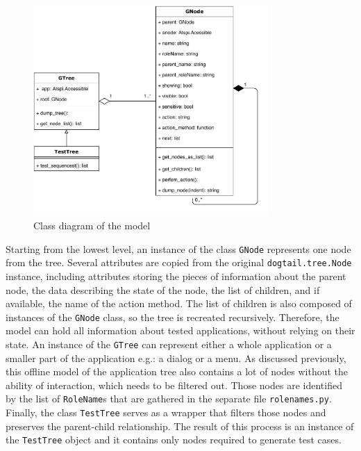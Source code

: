 \begin{figure}[hbt]
	\centering
	\includegraphics[width=0.8\textwidth,clip]{obrazky-figures/tree_diagram.pdf}
	\caption{Class diagram of the model}
	\label{tree_diagram}
\end{figure}

Starting from the lowest level, an instance of the class \texttt{GNode} represents one node from the tree. Several attributes are copied from the original \texttt{dogtail.tree.Node} instance, including attributes storing the pieces of information about the parent node, the data describing the state of the node, the list of children, and if available, the name of the action method. The list of children is also composed of instances of the \texttt{GNode} class, so the tree is recreated recursively. Therefore, the model can hold all information about tested applications, without relying on their state. An instance of the \texttt{GTree} can represent either a whole application or a smaller part of the application e.g.: a dialog or a menu. As discussed previously, this offline model of the application tree also contains a lot of nodes without the ability of interaction, which needs to be filtered out. Those nodes are identified by the list of \texttt{RoleName}s that are gathered in the separate file \texttt{rolenames.py}. Finally, the class \texttt{TestTree} serves as a wrapper that filters those nodes and preserves the parent-child relationship. The result of this process is an instance of the \texttt{TestTree} object and it contains only nodes required to generate test cases. 

